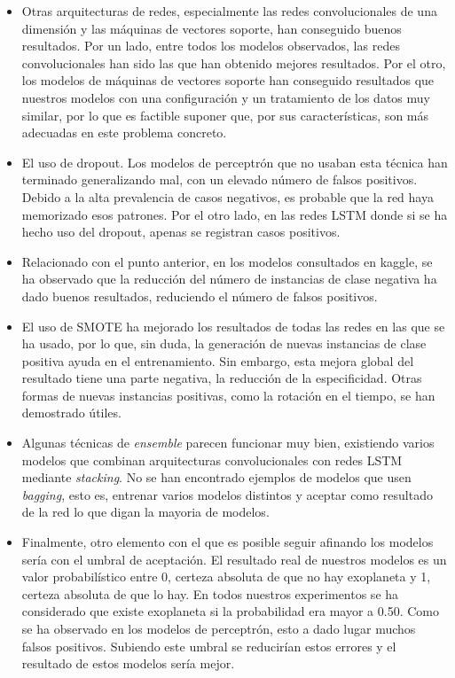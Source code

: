 \begin{itemize}
    \item Otras arquitecturas de redes, especialmente las redes convolucionales de una dimensión y las máquinas de vectores soporte, han conseguido buenos resultados. Por un lado, entre todos los modelos observados, las redes convolucionales han sido las que han obtenido mejores resultados. Por el otro, los modelos de máquinas de vectores soporte han conseguido resultados que nuestros modelos con una configuración y un tratamiento de los datos muy similar, por lo que es factible suponer que, por sus características, son más adecuadas en este problema concreto. 
    \item El uso de dropout. Los modelos de perceptrón que no usaban esta técnica han terminado generalizando mal, con un elevado número de falsos positivos. Debido a la alta prevalencia de casos negativos, es probable que la red haya memorizado esos patrones. Por el otro lado, en las redes LSTM donde si se ha hecho uso del dropout, apenas se registran casos positivos.
    \item Relacionado con el punto anterior, en los modelos consultados en kaggle, se ha observado que la reducción del número de instancias de clase negativa ha dado buenos resultados, reduciendo el número de falsos positivos.
    \item El uso de SMOTE ha mejorado los resultados de todas las redes en las que se ha usado, por lo que, sin duda, la generación de nuevas instancias de clase positiva ayuda en el entrenamiento. Sin embargo, esta mejora global del resultado tiene una parte negativa, la reducción de la especificidad. Otras formas de nuevas instancias positivas, como la rotación en el tiempo, se han demostrado útiles.
    \item Algunas técnicas de \textit{ensemble} parecen funcionar muy bien, existiendo varios modelos que combinan arquitecturas convolucionales con redes LSTM mediante \textit{stacking}. No se han encontrado ejemplos de modelos que usen \textit{bagging}, esto es, entrenar varios modelos distintos y aceptar como resultado de la red lo que digan la mayoria de modelos.
    \item Finalmente, otro elemento con el que es posible seguir afinando los modelos sería con el umbral de aceptación. El resultado real de nuestros modelos es un valor probabilístico entre 0, certeza absoluta de que no hay exoplaneta y 1, certeza absoluta de que lo hay. En todos nuestros experimentos se ha considerado que existe exoplaneta si la probabilidad era mayor a 0.50. Como se ha observado en los modelos de perceptrón, esto a dado lugar muchos falsos positivos. Subiendo este umbral se reducirían estos errores y el resultado de estos modelos sería mejor.
\end{itemize}